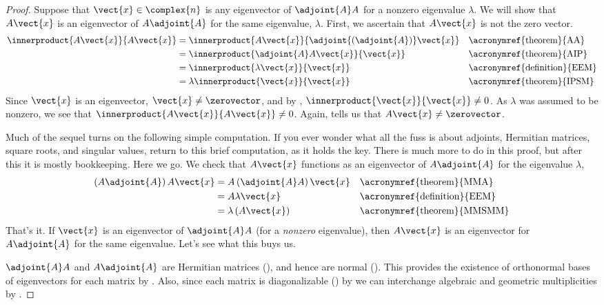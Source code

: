 %
\begin{proof}
%
Suppose that $\vect{x}\in\complex{n}$ is any eigenvector of $\adjoint{A}A$ for a nonzero eigenvalue $\lambda$.  We will show that $A\vect{x}$ is an eigenvector of $A\adjoint{A}$ for the same eigenvalue, $\lambda$.  First, we ascertain that $A\vect{x}$ is not the zero vector.
%
\begin{align*}
\innerproduct{A\vect{x}}{A\vect{x}}
&=\innerproduct{A\vect{x}}{\adjoint{\left(\adjoint{A}\right)}\vect{x}}&&\text{\acronymref{theorem}{AA}}\\
%
&=\innerproduct{\adjoint{A}A\vect{x}}{\vect{x}}&&\text{\acronymref{theorem}{AIP}}\\
%
&=\innerproduct{\lambda\vect{x}}{\vect{x}}&&\text{\acronymref{definition}{EEM}}\\
%
&=\lambda\innerproduct{\vect{x}}{\vect{x}}&&\text{\acronymref{theorem}{IPSM}}
%
\end{align*}
%
Since $\vect{x}$ is an eigenvector, $\vect{x}\neq\zerovector$, and by , $\innerproduct{\vect{x}}{\vect{x}}\neq 0$.  As $\lambda$ was assumed to be nonzero, we see that $\innerproduct{A\vect{x}}{A\vect{x}}\neq 0$.  Again,  tells us that $A\vect{x}\neq\zerovector$.\par
%
Much of the sequel turns on the following simple computation.  If you ever wonder what all the fuss is about adjoints, Hermitian matrices, square roots, and singular values, return to this brief computation, as it holds the key.  There is much more to do in this proof, but after this it is mostly bookkeeping.  Here we go.  We check that $A\vect{x}$ functions as an eigenvector of $A\adjoint{A}$ for the eigenvalue $\lambda$,
%
\begin{align*}
\left(A\adjoint{A}\right)A\vect{x}
&=A\left(\adjoint{A}A\right)\vect{x}&&\text{\acronymref{theorem}{MMA}}\\
&=A\lambda\vect{x}&&\text{\acronymref{definition}{EEM}}\\
&=\lambda\left(A\vect{x}\right)&&\text{\acronymref{theorem}{MMSMM}}
\end{align*}
%
That's it.  If $\vect{x}$ is an eigenvector of $\adjoint{A}A$ (for a {\em nonzero} eigenvalue), then $A\vect{x}$ is an eigenvector for $A\adjoint{A}$ for the same eigenvalue.  Let's see what this buys us.\par
%
$\adjoint{A}A$ and $A\adjoint{A}$ are Hermitian matrices (), and hence are normal ().  This provides the existence of orthonormal bases of eigenvectors for each matrix by .  Also, since each matrix is diagonalizable () by  we can interchange algebraic and geometric multiplicities by .\par

\end{proof}
